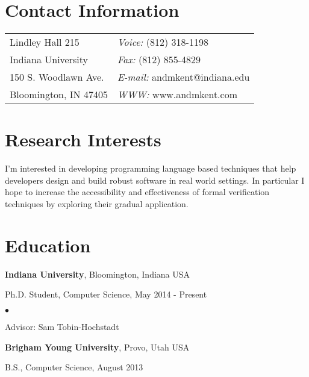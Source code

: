 \documentclass[margin,line]{res}
\newenvironment{list1}{
  \begin{list}{\ding{113}}{%
      \setlength{\itemsep}{0in}
      \setlength{\parsep}{0in} \setlength{\parskip}{0in}
      \setlength{\topsep}{0in} \setlength{\partopsep}{0in} 
      \setlength{\leftmargin}{0.17in}}}{\end{list}}
\newenvironment{list2}{
  \begin{list}{$\bullet$}{%
      \setlength{\itemsep}{0in}
      \setlength{\parsep}{0in} \setlength{\parskip}{0in}
      \setlength{\topsep}{0in} \setlength{\partopsep}{0in} 
      \setlength{\leftmargin}{0.2in}}}{\end{list}}
\begin{document}

\begin{resume}
\section{\sc Contact Information}
\vspace{.05in}
\begin{tabular}{@{}p{2in}p{4in}}
Lindley Hall 215            & {\it Voice:}  (812) 318-1198 \\            
Indiana University         & {\it Fax:}    (812) 855-4829 \\         
150 S. Woodlawn Ave.   & {\it E-mail:}  andmkent@indiana.edu\\       
Bloomington, IN 47405 & {\it WWW:} www.andmkent.com \\     
\end{tabular}


\section{\sc Research Interests}
I'm interested in developing programming language based techniques
that help developers design and build robust software in real world
settings.  In particular I hope to increase the accessibility and
effectiveness of formal verification techniques by exploring their
gradual application.
\section{\sc Education}
{\bf Indiana University}, Bloomington, Indiana USA\\
\vspace*{-.1in}
\begin{list1}
\item[] Ph.D. Student, Computer Science, May 2014 - Present
\begin{list2}
\vspace*{.05in}
\item Advisor:  Sam Tobin-Hochstadt
\end{list2}
\end{list1}

{\bf Brigham Young University}, Provo, Utah USA\\
\vspace*{-.1in}
\begin{list1}
\item[] B.S., Computer Science, August 2013
\end{list1}


\end{resume}
\end{document}
